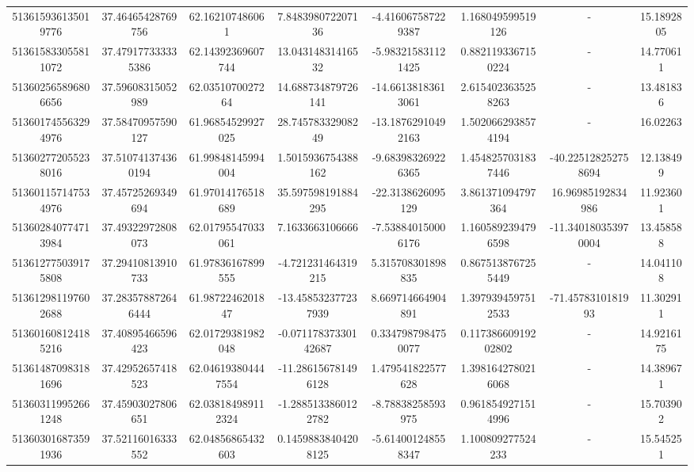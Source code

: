 \documentclass{article}
\begin{document}
\begin{landscape}
\begin{longtable}[c]{S[table-format=18.0]S[table-format=2.15]S[table-format=2.15]S[table-format=-2.17]S[table-format=-2.16]S[table-format=-2.16]S[table-format=-3.16]S[table-format=2.7]}
513615936135019776 & 37.46465428769756  & 62.162107486061    & 7.848398072207136    & -4.416067587229387   & 1.168049599519126    & {-}                  & 15.1892805 \\
513615833055811072 & 37.479177333335386 & 62.14392369607744  & 13.04314831416532    & -5.983215831121425   & 0.8821193367150224   & {-}                  & 14.770611  \\
513602565896806656 & 37.59608315052989  & 62.0351070027264   & 14.688734879726141   & -14.66138183613061   & 2.6154023635258263   & {-}                  & 13.481836  \\
513601745563294976 & 37.58470957590127  & 61.96854529927025  & 28.74578332908249    & -13.18762910492163   & 1.5020662938574194   & {-}                  & 16.02263   \\
513602772055238016 & 37.510741374360194 & 61.99848145994004  & 1.5015936754388162   & -9.683983269226365   & 1.4548257031837446   & -40.225128252758694 & 12.138499  \\
513601157147534976 & 37.45725269349694  & 61.97014176518689  & 35.597598191884295   & -22.3138626095129    & 3.861371094797364    & 16.96985192834986   & 11.923601  \\
513602840774713984 & 37.49322972808073  & 62.01795547033061  & 7.1633663106666      & -7.538840150006176   & 1.1605892394796598   & -11.340180353970004 & 13.458588  \\
513612775039175808 & 37.29410813910733  & 61.97836167899555  & -4.721231464319215   & 5.315708301898835    & 0.8675138767255449   & {-}                  & 14.041108  \\
513612981197602688 & 37.283578872646444 & 61.9872246201847   & -13.458532377237939  & 8.669714664904891    & 1.3979394597512533   & -71.4578310181993   & 11.302911  \\
513601608124185216 & 37.40895466596423  & 62.01729381982048  & -0.07117837330142687 & 0.3347987984750077   & 0.11738660919202802  & {-}                  & 14.9216175 \\
513614870983181696 & 37.42952657418523  & 62.046193804447554 & -11.286156781496128  & 1.479541822577628    & 1.3981642780216068   & {-}                  & 14.389671  \\
513603119952661248 & 37.45903027806651  & 62.038184989112324 & -1.2885133860122782  & -8.78838258593975    & 0.9618549271514996   & {-}                  & 15.703902  \\
513603016873591936 & 37.52116016333552  & 62.04856865432603  & 0.14598838404208125  & -5.614001248558347   & 1.100809277524233    & {-}                  & 15.545251  \\

\end{longtable}
\end{landscape}
\end{document}
